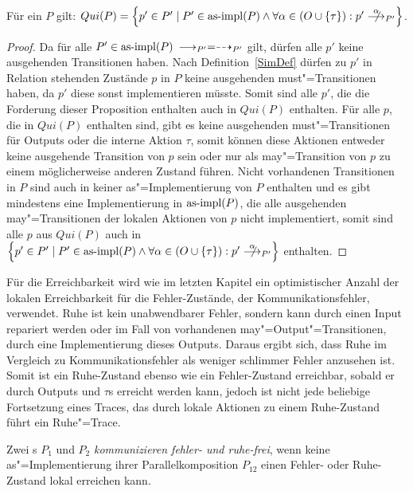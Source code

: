 \begin{Prop}
  Für ein \MEIO{} $P$ gilt: $Qui(P) = \left\{p'\in P'\mid P'\in\asimp (P)\land
  \forall\alpha\in (O\cup\{\tau\}):p' \nmust[\alpha]_{P'}\right\}$.
\end{Prop}
\begin{proof}
  Da für alle $P'\in\mathrm{as}\text{-}\mathrm{impl} (P)$ $\must_{P'} =\may_{P'}$ gilt, dürfen alle $p'$
  keine ausgehenden Transitionen haben. Nach Definition~\ref{SimDef} dürfen zu
  $p'$ in Relation stehenden Zustände $p$ in $P$ keine ausgehenden
  must"=Transitionen haben, da $p'$ diese sonst implementieren müsste. Somit
  sind alle $p'$, die die Forderung dieser Proposition enthalten auch in $Qui
  (P)$ enthalten. Für alle $p$, die in $Qui (P)$ enthalten sind, gibt es keine
  ausgehenden must"=Transitionen für Outputs oder die interne Aktion $\tau$,
  somit können diese Aktionen entweder keine ausgehende Transition von $p$ sein
  oder nur als may"=Transition von $p$ zu einem möglicherweise anderen Zustand
  führen. Nicht vorhandenen Transitionen in $P$ sind auch in keiner
  as"=Implementierung von $P$ enthalten und es gibt mindestens eine
  Implementierung in $\mathrm{as}\text{-}\mathrm{impl} (P)$, die alle ausgehenden may"=Transitionen der
  lokalen Aktionen von $p$ nicht implementiert, somit sind alle $p$ aus $Qui
  (P)$ auch in $\left\{p'\in P'\mid P'\in\asimp (P)\land \forall\alpha\in
  (O\cup\{\tau\}):p' \nmust[\alpha]_{P'}\right\}$ enthalten.
\end{proof}

Für die Erreichbarkeit wird wie im letzten Kapitel ein optimistischer Anzahl
der lokalen Erreichbarkeit für die Fehler-Zustände, der Kommunikationsfehler,
verwendet. Ruhe ist kein unabwendbarer Fehler, sondern kann durch einen Input
repariert werden oder im Fall von vorhandenen may"=Output"=Transitionen, durch
eine Implementierung dieses Outputs. Daraus ergibt sich, dass Ruhe im Vergleich
zu Kommunikationsfehler als weniger \glqq schlimmer Fehler\grqq{} anzusehen
ist. Somit ist ein Ruhe-Zustand ebenso wie ein Fehler-Zustand erreichbar,
sobald er durch Outputs und $\tau$s erreicht werden kann, jedoch ist nicht jede
beliebige Fortsetzung eines Traces, das durch lokale Aktionen zu einem
Ruhe-Zustand führt ein Ruhe"=Trace.

\begin{Def}
  Zwei \MEIO{}s $P_1$ und $P_2$ \emph{kommunizieren fehler- und ruhe-frei},
  wenn keine as"=Implementierung ihrer Parallelkomposition $P_{12}$ einen
  Fehler- oder Ruhe-Zustand lokal erreichen kann.
\end{Def}

